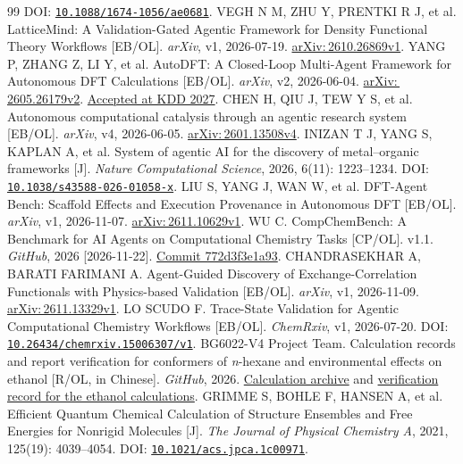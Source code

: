 \documentclass[a4paper,11pt]{article}
\newcommand{\doi}[1]{\href{https://doi.org/#1}{\nolinkurl{#1}}}
\newcommand{\ax}[1]{\href{https://arxiv.org/abs/#1}{arXiv:\,#1}}
\begin{document}
\begin{thebibliography}{99}
  DOI: \doi{10.1088/1674-1056/ae0681}.
  VEGH N M, ZHU Y, PRENTKI R J, et al.
  LatticeMind: A Validation-Gated Agentic Framework for Density Functional Theory
  Workflows [EB/OL].
  \emph{arXiv}, v1, 2026-07-19.
  \ax{2610.26869v1}.
  YANG P, ZHANG Z, LI Y, et al.
  AutoDFT: A Closed-Loop Multi-Agent Framework for Autonomous DFT Calculations [EB/OL].
  \emph{arXiv}, v2, 2026-06-04.
  \ax{2605.26179v2}.
  \href{https://phyang.top/}{Accepted at KDD 2027}.
  CHEN H, QIU J, TEW Y S, et al.
  Autonomous computational catalysis through an agentic research system [EB/OL].
  \emph{arXiv}, v4, 2026-06-05.
  \ax{2601.13508v4}.
  INIZAN T J, YANG S, KAPLAN A, et al.
  System of agentic AI for the discovery of metal--organic frameworks [J].
  \emph{Nature Computational Science}, 2026, 6(11): 1223--1234.
  DOI: \doi{10.1038/s43588-026-01058-x}.
  LIU S, YANG J, WAN W, et al.
  DFT-Agent Bench: Scaffold Effects and Execution Provenance in Autonomous DFT [EB/OL].
  \emph{arXiv}, v1, 2026-11-07.
  \ax{2611.10629v1}.
  WU C.
  CompChemBench: A Benchmark for AI Agents on Computational Chemistry Tasks [CP/OL].
  v1.1. \emph{GitHub}, 2026 [2026-11-22].
  \href{https://github.com/Chenghao-Wu/compchem-bench/tree/772d3f3e1a93}{Commit 772d3f3e1a93}.
  CHANDRASEKHAR A, BARATI FARIMANI A.
  Agent-Guided Discovery of Exchange-Correlation Functionals with Physics-based Validation
  [EB/OL].
  \emph{arXiv}, v1, 2026-11-09.
  \ax{2611.13329v1}.
  LO SCUDO F.
  Trace-State Validation for Agentic Computational Chemistry Workflows [EB/OL].
  \emph{ChemRxiv}, v1, 2026-07-20.
  DOI: \doi{10.26434/chemrxiv.15006307/v1}.
  BG6022-V4 Project Team.
  Calculation records and report verification for conformers of \emph{n}-hexane
  and environmental effects on ethanol [R/OL, in Chinese].
  \emph{GitHub}, 2026.
  \href{https://github.com/az87988799/BG6022-v4/blob/1e8795b0b10deb8f288eccb9d95befb742958ff9/FinalReport-LaTeX/sections/06a-calculation-results.tex}
    {Calculation archive} and
  \href{https://github.com/az87988799/BG6022-v4/blob/1eefccdb742ed81692900f9660a8db950ae1f273/docs/acceptance/live-failure-repair-20261021/repair-report.md}
    {verification record for the ethanol calculations}.
  GRIMME S, BOHLE F, HANSEN A, et al.
  Efficient Quantum Chemical Calculation of Structure Ensembles and Free Energies for
  Nonrigid Molecules [J].
  \emph{The Journal of Physical Chemistry A}, 2021, 125(19): 4039--4054.
  DOI: \doi{10.1021/acs.jpca.1c00971}.
\end{thebibliography}
\endgroup
\end{document}
